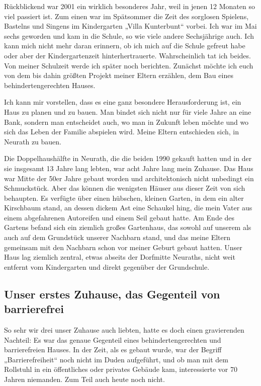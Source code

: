 \documentclass[fontsize=14pt,a4paper,headinclude,DIV=calc,automark]{scrbook}
\begin{document}
Rückblickend war 2001 ein wirklich besonderes Jahr, weil in jenen 12 Monaten so viel passiert ist. Zum einen war im Spätsommer die Zeit des sorglosen Spielens, Bastelns und Singens im Kindergarten „Villa Kunterbunt“ vorbei. Ich war im Mai sechs geworden und kam in die Schule, so wie viele andere Sechsjährige auch. Ich kann mich nicht mehr daran erinnern, ob ich mich auf die Schule gefreut habe oder aber der Kindergartenzeit hinterhertrauerte. Wahrscheinlich tat ich beides. Von meiner Schulzeit werde ich später noch berichten. Zunächst möchte ich euch von dem bis dahin größten Projekt meiner Eltern erzählen, dem Bau eines behindertengerechten Hauses.

Ich kann mir vorstellen, dass es eine ganz besondere Herausforderung ist, ein Haus zu planen und zu bauen. Man bindet sich nicht nur für viele Jahre an eine Bank, sondern man entscheidet auch, wo man in Zukunft leben möchte und wo sich das Leben der Familie abspielen wird. Meine Eltern entschieden sich, in Neurath zu bauen.

Die Doppelhaushälfte in Neurath, die die beiden 1990 gekauft hatten und in der sie insgesamt 13 Jahre lang lebten, war acht Jahre lang mein Zuhause. Das Haus war Mitte der 50er Jahre gebaut worden und architektonisch nicht unbedingt ein Schmuckstück. Aber das können die wenigsten Häuser aus dieser Zeit von sich behaupten. Es verfügte über einen hübschen, kleinen Garten, in dem ein alter Kirschbaum stand, an dessen dickem Ast eine Schaukel hing, die mein Vater aus einem abgefahrenen Autoreifen und einem Seil gebaut hatte. Am Ende des Gartens befand sich ein ziemlich großes Gartenhaus, das sowohl auf unserem als auch auf dem Grundstück unserer Nachbarn stand, und das meine Eltern gemeinsam mit den Nachbarn schon vor meiner Geburt gebaut hatten. Unser Haus lag ziemlich zentral, etwas abseits der Dorfmitte Neuraths, nicht weit entfernt vom Kindergarten und direkt gegenüber der Grundschule.

\subsection{Unser erstes Zuhause, das Gegenteil von barrierefrei}

So sehr wir drei unser Zuhause auch liebten, hatte es doch einen gravierenden Nachteil: Es war das genaue Gegenteil eines behindertengerechten und barrierefreien Hauses. In der Zeit, als es gebaut wurde, war der Begriff „Barrierefreiheit“ noch nicht im Duden aufgeführt, und ob man mit dem Rollstuhl in ein öffentliches oder privates Gebäude kam, interessierte vor 70 Jahren niemanden. Zum Teil auch heute noch nicht.
\end{document}
